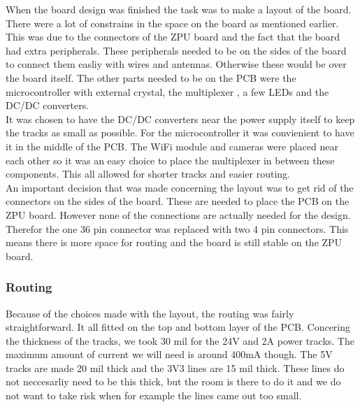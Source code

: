 \documentclass{article}
\begin{document}
When the board design was finished the task was to make a layout of the board. There were a lot of constrains in the space on the board as mentioned earlier. This was due to the connectors of the ZPU board and the fact that the board had extra peripherals. These peripherals needed to be on the sides of the board to connect them easliy with wires and antennas. Otherwise these would be over the board itself.  The other parts needed to be on the PCB were the microcontroller with external crystal, the multiplexer , a few LEDs and the DC/DC converters.\\
It was chosen to have the DC/DC converters near the power supply itself to keep the tracks as small as possible. For the microcontroller  it was convienient to have it in the middle of the PCB. The WiFi module and cameras were placed near each other so it was an easy choice to place the multiplexer in between these components. This all allowed for shorter tracks and easier routing.\\
An important decision that was made concerning the layout was to get rid of the connectors on the sides of the board. These are needed to place the PCB on the ZPU board. However none of the connections are actually needed for the design. Therefor the one 36 pin connector was replaced with two 4 pin connectors. This means there is more space for routing and the board is still stable on the ZPU  board.\\


\subsubsection{Routing}

Because of the choices made with the layout, the routing was fairly straightforward. It all fitted on the top and bottom layer of the PCB. Concering the thickness of the tracks, we took 30 mil for the 24V and 2A  power tracks. The maximum amount of current we will need is around 400mA though. The 5V tracks are made 20 mil thick and the 3V3 lines are 15 mil thick. These lines do not neccesarliy need to be this thick, but the room is there to do it and we do not want to take risk when for example the lines came out too small.
\end{document}
